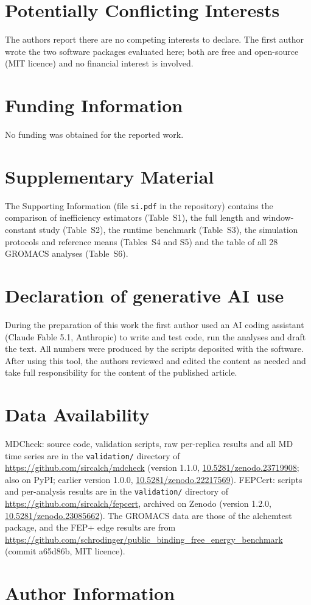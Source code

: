 \documentclass[9pt,lessons]{livecoms}
\begin{document}
\section*{Potentially Conflicting Interests}
The authors report there are no competing interests to declare. The first author wrote the two software packages evaluated here; both are free and open-source (MIT licence) and no financial interest is involved.

\section*{Funding Information}
No funding was obtained for the reported work.

\section*{Supplementary Material}
The Supporting Information (file \texttt{si.pdf} in the repository) contains the comparison of inefficiency estimators (Table~S1), the full length and window-constant study (Table~S2), the runtime benchmark (Table~S3), the simulation protocols and reference means (Tables~S4 and S5) and the table of all 28 GROMACS analyses (Table~S6).

\section*{Declaration of generative AI use}
During the preparation of this work the first author used an AI coding assistant (Claude Fable 5.1, Anthropic) to write and test code, run the analyses and draft the text. All numbers were produced by the scripts deposited with the software. After using this tool, the authors reviewed and edited the content as needed and take full responsibility for the content of the published article.

\section*{Data Availability}
MDCheck: source code, validation scripts, raw per-replica results and all MD time series are in the \texttt{validation/} directory of \url{https://github.com/sircalch/mdcheck} (version 1.1.0, \href{https://doi.org/10.5281/zenodo.23719908}{10.5281/zenodo.23719908}; also on PyPI; earlier version 1.0.0, \href{https://doi.org/10.5281/zenodo.22217569}{10.5281/zenodo.22217569}). FEPCert: scripts and per-analysis results are in the \texttt{validation/} directory of \url{https://github.com/sircalch/fepcert}, archived on Zenodo (version 1.2.0, \href{https://doi.org/10.5281/zenodo.23085662}{10.5281/zenodo.23085662}). The GROMACS data are those of the alchemtest package, and the FEP+ edge results are from \url{https://github.com/schrodinger/public_binding_free_energy_benchmark} (commit a65d86b, MIT licence).

\section*{Author Information}
\makeorcid


\end{document}
